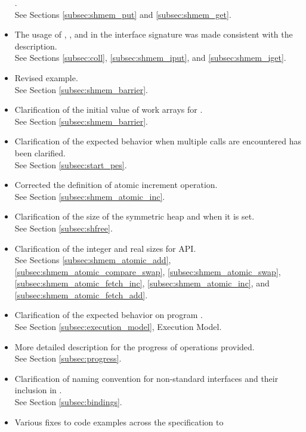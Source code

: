 \begin{itemize}
      .
\\See Sections \ref{subsec:shmem_put} and \ref{subsec:shmem_get}. 
%
\item The usage of , , and  in the
      interface signature was made consistent with the description.
\\See Sections \ref{subsec:coll}, \ref{subsec:shmem_iput}, and \ref{subsec:shmem_iget}.
%
\item Revised  example.
\\See Section \ref{subsec:shmem_barrier}. 
%
\item Clarification of the initial value of  work arrays for
.\\ See Section \ref{subsec:shmem_barrier}. 
%
\item Clarification of the expected behavior when multiple 
calls are encountered has been clarified.
\\See Section \ref{subsec:start_pes}.
%
\item Corrected the definition of atomic increment operation.
\\See Section \ref{subsec:shmem_atomic_inc}.
%
\item Clarification of the size of the symmetric heap and when it is set.
\\See Section \ref{subsec:shfree}.
%
\item Clarification of the integer and real sizes for \Fortran{} \ac{API}.
\\See Sections \ref{subsec:shmem_atomic_add},
      \ref{subsec:shmem_atomic_compare_swap},
      \ref{subsec:shmem_atomic_swap},
      \ref{subsec:shmem_atomic_fetch_inc},
      \ref{subsec:shmem_atomic_inc}, and
      \ref{subsec:shmem_atomic_fetch_add}.
%
\item Clarification of the expected behavior on program .
\\See Section \ref{subsec:execution_model}, Execution Model. 
%
\item More detailed description for the progress of \openshmem operations
provided.
\\See Section \ref{subsec:progress}. 
%
\item Clarification of naming convention for non-standard interfaces and their
inclusion in .
\\See Section \ref{subsec:bindings}. 
%
\item Various fixes to \openshmem code examples across the specification to

\end{itemize}

